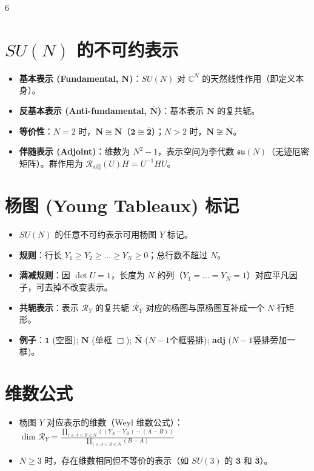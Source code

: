 \documentclass[landscape]{article}
\begin{document}
\begin{multicols*}{6}
\section*{$SU(N)$ 的不可约表示}
\begin{itemize}
  \item \textbf{基本表示 (Fundamental, $\mathbf{N}$)}：$SU(N)$ 对 $\mathbb{C}^N$ 的天然线性作用（即定义本身）。
  \item \textbf{反基本表示 (Anti-fundamental, $\overline{\mathbf{N}}$)}：基本表示 $\mathbf{N}$ 的复共轭。
  \item \textbf{等价性}：$N=2$ 时，$\mathbf{N} \cong \overline{\mathbf{N}}$（$\mathbf{2} \cong \overline{\mathbf{2}}$）；$N > 2$ 时，$\mathbf{N} \not\cong \overline{\mathbf{N}}$。
  \item \textbf{伴随表示 (Adjoint)}：维数为 $N^2-1$，表示空间为李代数 $\mathfrak{su}(N)$（无迹厄密矩阵）。群作用为 $\mathcal{R}_{\text{adj}}(U)H = U^{-1}HU$。
\end{itemize}

\section*{杨图 (Young Tableaux) 标记}
\begin{itemize}
  \item $SU(N)$ 的任意不可约表示可用杨图 $Y$ 标记。
  \item \textbf{规则}：行长 $Y_1 \ge Y_2 \ge \dots \ge Y_N \ge 0$；总行数不超过 $N$。
  \item \textbf{满减规则}：因 $\det U=1$，长度为 $N$ 的列（$Y_1=\dots=Y_N=1$）对应平凡因子，可去掉不改变表示。
  \item \textbf{共轭表示}：表示 $\mathcal{R}_Y$ 的复共轭 $\overline{\mathcal{R}_Y}$ 对应的杨图与原杨图互补成一个 $N$ 行矩形。
  \item \textbf{例子}：$\mathbf{1}$ (空图); $\mathbf{N}$ (单框 $\Box$); $\overline{\mathbf{N}}$ ($N-1$个框竖排); \textbf{adj} ($N-1$竖排旁加一框)。
\end{itemize}

\section*{维数公式}
\begin{itemize}
  \item 杨图 $Y$ 对应表示的维数（Weyl 维数公式）：
  \\
  $\dim \mathcal{R}_Y = \frac{\prod_{1\le A<B \le N}((Y_A - Y_B) - (A - B))}{\prod_{1\le A<B \le N}(B - A)}$
  \item $N \ge 3$ 时，存在维数相同但不等价的表示（如 $SU(3)$ 的 $\mathbf{3}$ 和 $\overline{\mathbf{3}}$）。
\end{itemize}


\end{multicols*}
\end{document}

